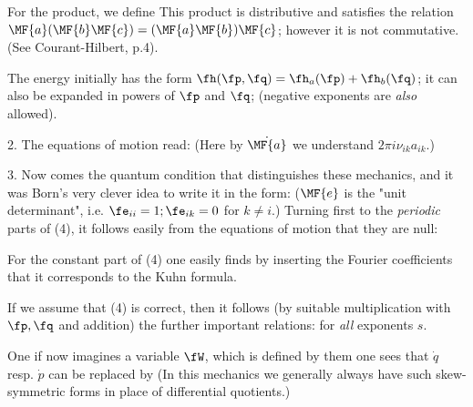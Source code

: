 For the product, we define
This product is distributive and satisfies the relation $\MF{a}(\MF{b}\MF{c}) = (\MF{a}\MF{b})\MF{c}$; however it is not commutative. (See Courant-Hilbert, p.4).

The energy initially has the form $\fh(\fp,\fq) = \fh_a(\fp) + \fh_b(\fq)$; it can also be expanded in powers of $\fp$ and $\fq$; (negative exponents are \textit{also} allowed).


2. The equations of motion read:
(Here by $\dot{\MF{a}}$ we understand $2\pi i \nu_{ik} a_{ik}$.)

3. Now comes the quantum condition that distinguishes these mechanics, and it was Born's very clever idea to write it in the form:
($\MF{e}$ is the "unit determinant", i.e. $\fe_{ii}=1; \fe_{ik}=0$ for $k \neq i$.) Turning first to the \textit{periodic} parts of (4), it follows easily from the equations of motion that they are null:

For the constant part of (4) one easily finds by inserting the Fourier coefficients that it corresponds to the Kuhn formula.

If we assume that (4) is correct, then it follows (by suitable multiplication with $\fp,\fq$ and addition) the further important relations:
for \textit{all} exponents $s$.

One if now imagines a variable $\fW$, which is defined by
them one sees that $\dot{q}$ resp. $\dot{p}$ can be replaced by
(In this mechanics we generally always have such skew-symmetric forms in place of differential quotients.)

